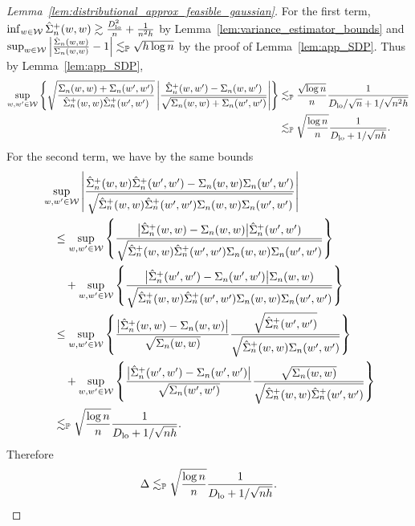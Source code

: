 \begin{proof}[Lemma~\ref{lem:distributional_approx_feasible_gaussian}]
  For the first term,
  $\inf_{w \in \mathcal{W}} \hat \Sigma_n^+(w,w)
  \gtrsim \frac{D_{\textup{lo}}^2}{n} + \frac{1}{n^2h}$
  by Lemma~\ref{lem:variance_estimator_bounds} and
  $\sup_{w \in \mathcal{W}}
  \left|\frac{\hat \Sigma_n(w,w)}{\Sigma_n(w,w)} - 1\right|
  \lesssim_{\mathbb{P}} \sqrt{h \log n}$
  by the proof of Lemma~\ref{lem:app_SDP}.
  Thus by Lemma~\ref{lem:app_SDP},
  \begin{align*}
    \sup_{w, w' \in \mathcal{W}}
    \left\{
    \sqrt{\frac{\Sigma_n(w,w) + \Sigma_n(w',w')}
      {\hat \Sigma_n^+(w,w) \hat \Sigma_n^+(w',w')}}
    \left|
    \frac{\hat \Sigma_n^+(w,w') - \Sigma_n(w,w')}
    {\sqrt{\Sigma_n(w,w) + \Sigma_n(w',w')}}
    \right|
    \right\}
    &\lesssim_{\mathbb{P}}
    \frac{\sqrt{\log n}}{n}
    \frac{1}{D_{\textup{lo}}/\sqrt{n} + 1/\sqrt{n^2h}} \\
    &\lesssim_{\mathbb{P}}
    \sqrt{\frac{\log n}{n}}
    \frac{1}{D_{\textup{lo}} + 1/\sqrt{nh}}.
  \end{align*}
  For the second term, we have by the same bounds
  \begin{align*}
    &\sup_{w, w' \in \mathcal{W}}
    \left|
    \frac{\hat \Sigma_n^+(w,w) \hat \Sigma_n^+(w',w')
      - \Sigma_n(w,w) \Sigma_n(w',w')}
    {\sqrt{\hat \Sigma_n^+(w,w) \hat \Sigma_n^+(w',w')
        \Sigma_n(w,w) \Sigma_n(w',w')}}
    \right| \\
    &\quad\leq
    \sup_{w, w' \in \mathcal{W}}
    \left\{
    \frac{\big| \hat \Sigma_n^+(w,w) - \Sigma_n(w,w)\big|
      \hat \Sigma_n^+(w',w')}
    {\sqrt{\hat \Sigma_n^+(w,w) \hat \Sigma_n^+(w',w')
        \Sigma_n(w,w) \Sigma_n(w',w')}}
      \right\} \\
    &\qquad+
      \sup_{w, w' \in \mathcal{W}}
      \left\{
    \frac{\big| \hat \Sigma_n^+(w',w') - \Sigma_n(w',w')\big|
      \Sigma_n(w,w)}
    {\sqrt{\hat \Sigma_n^+(w,w) \hat \Sigma_n^+(w',w')
        \Sigma_n(w,w) \Sigma_n(w',w')}}
    \right\} \\
    &\quad\leq
    \sup_{w, w' \in \mathcal{W}}
    \left\{
    \frac{\big| \hat \Sigma_n^+(w,w) - \Sigma_n(w,w)\big|}
    {\sqrt{\Sigma_n(w,w)}}
    \frac{\sqrt{\hat \Sigma_n^+(w',w')}}
    {\sqrt{\hat \Sigma_n^+(w,w) \Sigma_n(w',w')}}
    \right\} \\
    &\qquad+
    \sup_{w, w' \in \mathcal{W}}
    \left\{
    \frac{\big| \hat \Sigma_n^+(w',w') - \Sigma_n(w',w')\big|}
    {\sqrt{\Sigma_n(w',w')}}
    \frac{\sqrt{\Sigma_n(w,w)}}
    {\sqrt{\hat \Sigma_n^+(w,w) \hat \Sigma_n^+(w',w')}}
    \right\} \\
    &\quad\lesssim_{\mathbb{P}}
    \sqrt{\frac{\log n}{n}}
    \frac{1}{D_{\textup{lo}} + 1/\sqrt{nh}}.
  \end{align*}
  Therefore
  \begin{align*}
    \Delta \lesssim_{\mathbb{P}}
    \sqrt{\frac{\log n}{n}}
    \frac{1}{D_{\textup{lo}} + 1/\sqrt{nh}}.
  \end{align*}


\end{proof}
